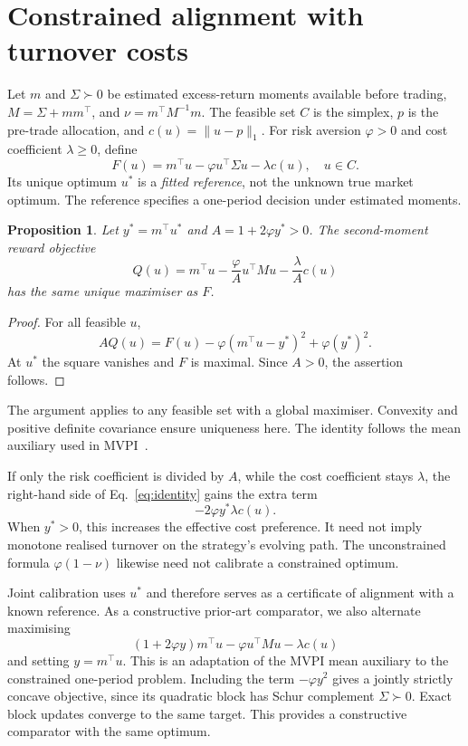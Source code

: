\documentclass[sigconf,review]{acmart}
\newtheorem{proposition}{Proposition}
\begin{document}
\section{Constrained alignment with turnover costs}
Let $m$ and $\Sigma\succ0$ be estimated excess-return moments available before trading, $M=\Sigma+mm^\top$, and $\nu=m^\top M^{-1}m$. The feasible set $C$ is the simplex, $p$ is the pre-trade allocation, and $c(u)=\|u-p\|_1$. For risk aversion $\varphi>0$ and cost coefficient $\lambda\ge0$, define
\begin{equation}\label{eq:target}
 F(u)=m^\top u-\varphi u^\top\Sigma u-\lambda c(u),\quad u\in C.
\end{equation}
Its unique optimum $u^*$ is a \emph{fitted reference}, not the unknown true market optimum. The reference specifies a one-period decision under estimated moments.

\begin{proposition}\label{prop:joint}
Let $y^*=m^\top u^*$ and $A=1+2\varphi y^*>0$. The second-moment reward objective
\begin{equation}
 Q(u)=m^\top u-\frac{\varphi}{A}u^\top M u-\frac{\lambda}{A}c(u)
\end{equation}
has the same unique maximiser as $F$.
\end{proposition}
\begin{proof}
For all feasible $u$,
\begin{equation}\label{eq:identity}
 AQ(u)=F(u)-\varphi(m^\top u-y^*)^2+\varphi(y^*)^2.
\end{equation}
At $u^*$ the square vanishes and $F$ is maximal. Since $A>0$, the assertion follows.
\end{proof}
The argument applies to any feasible set with a global maximiser. Convexity and positive definite covariance ensure uniqueness here. The identity follows the mean auxiliary used in MVPI\ \cite{zhang2021}.

If only the risk coefficient is divided by $A$, while the cost coefficient stays $\lambda$, the right-hand side of Eq.\ \eqref{eq:identity} gains the extra term
\begin{equation}\label{eq:costdistortion}
 -2\varphi y^*\lambda c(u).
\end{equation}
When $y^*>0$, this increases the effective cost preference. It need not imply monotone realised turnover on the strategy's evolving path. The unconstrained formula $\varphi(1-\nu)$ likewise need not calibrate a constrained optimum.

Joint calibration uses $u^*$ and therefore serves as a certificate of alignment with a known reference. As a constructive prior-art comparator, we also alternate maximising
\begin{equation}
 (1+2\varphi y)m^\top u-\varphi u^\top Mu-\lambda c(u)
\end{equation}
and setting $y=m^\top u$. This is an adaptation of the MVPI mean auxiliary to the constrained one-period problem. Including the term $-\varphi y^2$ gives a jointly strictly concave objective, since its quadratic block has Schur complement $\Sigma\succ0$. Exact block updates converge to the same target. This provides a constructive comparator with the same optimum.
\end{document}
